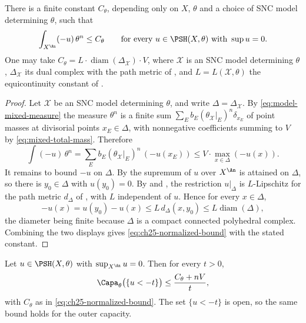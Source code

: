\begin{lemma}
\label{lem:ch25-normalized-bound}
There is a finite constant $C_\theta$, depending only on $X$, $\theta$
and a choice of SNC model determining $\theta$, such that
\begin{equation}
\label{eq:ch25-normalized-bound}
 \int_{X^{\An}}(-u)\,\theta^n\leq C_\theta
 \qquad\text{for every }u\in\PSH(X,\theta)\text{ with }\sup u=0 .
\end{equation}
One may take $C_\theta=L\cdot\operatorname{diam}(\Delta_{\mathcal X})\cdot
V$, where $\mathcal X$ is an SNC model determining $\theta$,
$\Delta_{\mathcal X}$ its dual complex with the path metric of
, and $L=L(\mathcal X,\theta)$ the equicontinuity
constant of .
\end{lemma}

\begin{proof}
Let $\mathcal X$ be an SNC model determining $\theta$, and write
$\Delta=\Delta_{\mathcal X}$.  By
\eqref{eq:model-mixed-measure} the measure $\theta^n$ is a finite sum
$\sum_Eb_E(\theta_{\mathcal X}|_E)^n\delta_{x_E}$ of point masses at
divisorial points $x_E\in\Delta$, with nonnegative coefficients summing to
$V$ by \eqref{eq:mixed-total-mass}.  Therefore
\[
 \int(-u)\,\theta^n=\sum_Eb_E(\theta_{\mathcal X}|_E)^n\,(-u(x_E))
 \leq V\cdot\max_{x\in\Delta}(-u(x)) .
\]
It remains to bound $-u$ on $\Delta$.  By
 the supremum of $u$ over $X^{\An}$ is
attained on $\Delta$, so there is $y_0\in\Delta$ with $u(y_0)=0$.  By
 and
, the restriction $u|_\Delta$ is
$L$-Lipschitz for the path metric $d_\Delta$ of
, with $L$ independent of $u$.  Hence for
every $x\in\Delta$,
\[
 -u(x)=u(y_0)-u(x)\leq L\,d_\Delta(x,y_0)
 \leq L\operatorname{diam}(\Delta),
\]
the diameter being finite because $\Delta$ is a compact connected
polyhedral complex.  Combining the two displays gives
\eqref{eq:ch25-normalized-bound} with the stated constant.
\end{proof}

\begin{proposition}
\label{prop:ch25-sublevel-capacity}
Let $u\in\PSH(X,\theta)$ with $\sup_{X^{\An}}u=0$.  Then for every
$t>0$,
\begin{equation}
\label{eq:ch25-sublevel-capacity}
 \Capa_\theta\bigl(\{u<-t\}\bigr)
 \leq\frac{C_\theta+nV}{t},
\end{equation}
with $C_\theta$ as in \eqref{eq:ch25-normalized-bound}.  The set
$\{u<-t\}$ is open, so the same bound holds for the outer capacity.
\end{proposition}

